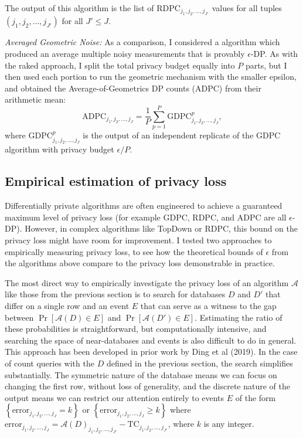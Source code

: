 \documentclass{article}
\begin{document}
The output of this algorithm is the list of $
\mathrm{RDPC}_{j_1, j_2, \ldots, j_{J'}}$ values for all tuples $(j_1, j_2, \ldots, j_{J'})$ for all $J' \leq J$.

\emph{Averaged Geometric Noise:} As a comparison, I considered a algorithm which produced an average multiple noisy measurements that is provably $\epsilon$-DP.  As with the raked approach, I split the total privacy budget equally into $P$ parts, but I then used each portion to run the geometric mechanism with the smaller epsilon, and obtained the Average-of-Geometrics DP counts (ADPC) from their arithmetic mean:
$$
\mathrm{ADPC}_{j_1,j_2,\ldots, j_{J}} =
\frac{1}{P}\sum_{p=1}^P
\mathrm{GDPC}_{j_1, j_2, \ldots, j_{J}}^p,
$$
where $\mathrm{GDPC}_{j_1, j_2, \ldots, j_{J}}^p$ is the output of an independent replicate of the GDPC algorithm with privacy budget $\epsilon/P$.

\subsection{Empirical estimation of privacy loss}
Differentially private algorithms are often engineered to achieve a guaranteed maximum level of privacy loss (for example GDPC, RDPC, and ADPC are all $\epsilon$-DP).  However, in complex algorithms like TopDown or RDPC, this bound on the privacy loss might have room for improvement.  I tested two approaches to empirically measuring privacy loss, to see how the theoretical bounds of $\epsilon$ from the algorithms above compare to the privacy loss demonstrable in practice.

The most direct way to empirically investigate the privacy loss of an algorithm $\mathcal{A}$ like those from the previous section is to search for databases $D$ and $D'$ that differ on a single row and an event $E$ that can serve as a witness to the gap between $\Pr[\mathcal{A}(D) \in E]$ and $\Pr[\mathcal{A}(D') \in E]$.  Estimating the ratio of these probabilities is straightforward, but computationally intensive, and searching the space of near-databases and events is also difficult to do in general.  This approach has been developed in prior work by Ding et al (2019).\cite{ding2018detecting}  In the case of count queries with the $D$ defined in the previous section, the search simplifies substantially.  The symmetric nature of the database means we can focus on changing the first row, without loss of generality, and the discrete nature of the output means we can restrict our attention entirely to events $E$ of the form $\left\{\mathrm{error}_{j_1, j_2, \ldots, j_{J}}
= k\right\}$ or $\left\{\mathrm{error}_{j_1, j_2, \ldots, j_{J}} \geq k\right\}$ where $\mathrm{error}_{j_1, j_2, \ldots, j_{J}} = \mathcal{A}(D)_{j_1, j_2, \ldots, j_{J'}}
- \mathrm{TC}_{j_1, j_2, \ldots, j_{J'}}$, where $k$ is any integer.
\end{document}
